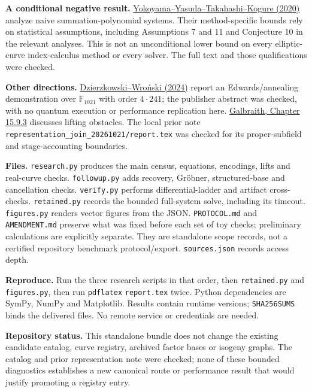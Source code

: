 \documentclass[11pt]{article}
\begin{document}
\textbf{A conditional negative result.} \href{https://www.degruyterbrill.com/document/doi/10.1515/jmc-2019-0029/html}{Yokoyama--Yasuda--Takahashi--Kogure (2020)} analyze naive summation-polynomial systems. Their method-specific bounds rely on statistical assumptions, including Assumptions 7 and 11 and Conjecture 10 in the relevant analyses. This is not an unconditional lower bound on every elliptic-curve index-calculus method or every solver. The full text and those qualifications were checked.

\textbf{Other directions.} \href{https://reference-global.com/article/10.2478/tmmp-2024-0021?tab=article}{Dzierzkowski--Wro\'nski (2024)} report an Edwards/annealing demonstration over $\mathbb F_{1021}$ with order $4\cdot241$; the publisher abstract was checked, with no quantum execution or performance replication here. \href{https://www.math.auckland.ac.nz/~sgal018/crypto-book/ch15.pdf}{Galbraith, Chapter 15.9.3} discusses lifting obstacles. The local prior note \nolinkurl{representation_join_20261021/report.tex} was checked for its proper-subfield and stage-accounting boundaries.

\textbf{Files.} \texttt{research.py} produces the main census, equations, encodings, lifts and real-curve checks. \texttt{followup.py} adds recovery, Gr\"obner, structured-base and cancellation checks. \texttt{verify.py} performs differential-ladder and artifact cross-checks. \texttt{retained.py} records the bounded full-system solve, including its timeout. \texttt{figures.py} renders vector figures from the JSON. \texttt{PROTOCOL.md} and \texttt{AMENDMENT.md} preserve what was fixed before each set of toy checks; preliminary calculations are explicitly separate. They are standalone scope records, not a certified repository benchmark protocol/export. \texttt{sources.json} records access depth.

\textbf{Reproduce.} Run the three research scripts in that order, then \texttt{retained.py} and \texttt{figures.py}, then run \texttt{pdflatex} \texttt{report.tex} twice. Python dependencies are SymPy, NumPy and Matplotlib. Results contain runtime versions; \texttt{SHA256SUMS} binds the delivered files. No remote service or credentials are needed.

\textbf{Repository status.} This standalone bundle does not change the existing candidate catalog, curve registry, archived factor bases or isogeny graphs. The catalog and prior representation note were checked; none of these bounded diagnostics establishes a new canonical route or performance result that would justify promoting a registry entry.
\end{document}
